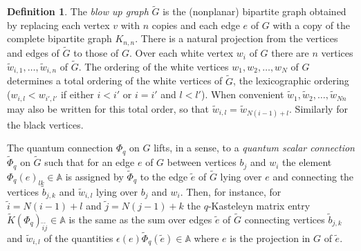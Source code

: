 \documentclass[12pt, reqno]{amsart}
\theoremstyle{definition}
\newtheorem{defi}[theo]{Definition}
\renewcommand{\tilde}{\widetilde}
\begin{document}
\begin{defi}
The \emph{blow up graph} $\tilde{G}$ is the (nonplanar) bipartite graph obtained by replacing each vertex $v$ with $n$ copies and each edge $e$ of $G$ with a   copy of the complete bipartite graph $K_{n,n}$.  There is a natural projection from the vertices and edges of $\tilde{G}$ to those of $G$.   Over each white vertex $w_i$ of $G$ there are $n$ vertices $\tilde w_{i,1},\dots,\tilde w_{i,n}$ of $\tilde G$. The ordering of the white vertices   $w_1, w_2, \dots, w_N$ of $G$ determines a total ordering of the white vertices of $\tilde G$, the lexicographic ordering   ($w_{i,l}<w_{i',l'}$ if either $i<i'$ or $i=i'$ and $l<l'$).    When convenient $\tilde{w}_1, \tilde{w}_2, \dots, \tilde{w}_{Nn}$ may also be written for this total order, so that $\tilde w_{i,l}=\tilde w_{N(i-1)+l}$. Similarly for the black vertices.

The quantum connection $\Phi_q$ on $G$ lifts, in a sense, to a \emph{quantum scalar connection} $\tilde{\Phi}_q$ on $\tilde{G}$ such that for an edge $e$ of $G$ between vertices $b_j$ and $w_i$ the element $\Phi_q(e)_{lk}\in\mathbb{A}$ is assigned by $\tilde{\Phi}_q$ to the edge $\tilde{e}$ of $\tilde{G}$ lying over $e$ and connecting the vertices $\tilde{b}_{j,k}$ and $\tilde{w}_{i,l}$ lying over $b_j$ and $w_i$.  Then, for instance, for $\tilde{i}=N(i-1)+l$ and $\tilde{j}=N(j-1)+k$ the $q$-Kasteleyn matrix entry $\tilde{K}(\Phi_q)_{\tilde{i}\tilde{j}}\in\mathbb{A}$ is the same as the sum over edges $\tilde{e}$ of $\tilde{G}$ connecting vertices $\tilde{b}_{j,k}$ and $\tilde{w}_{i,l}$ of the quantities $\epsilon(e)\tilde{\Phi}_q(\tilde{e})\in\mathbb{A}$ where $e$ is the projection in $G$ of $\tilde{e}$.


\end{defi}
\end{document}
